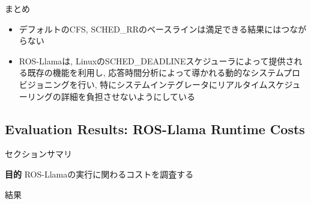 
\begin{frame}{まとめ}
    \begin{itemize}
        \item デフォルトのCFS, SCHED\_RRのベースラインは満足できる結果にはつながらない
        \item ROS-Llamaは, LinuxのSCHED\_DEADLINEスケジューラによって提供される既存の機能を利用し, 応答時間分析によって導かれる動的なシステムプロビジョニングを行い, 特にシステムインテグレータにリアルタイムスケジューリングの詳細を負担させないようにしている
    \end{itemize}
\end{frame}


\subsection{Evaluation Results: ROS-Llama Runtime Costs}
\label{ssec: evaluation results: ros-llama runtime costs}

\begin{frame}{セクションサマリ}
    \begin{itembox}[l]{\textbf{目的}}
        ROS-Llamaの実行に関わるコストを調査する
    \end{itembox}
\end{frame}

\begin{frame}{結果}
\end{frame}

